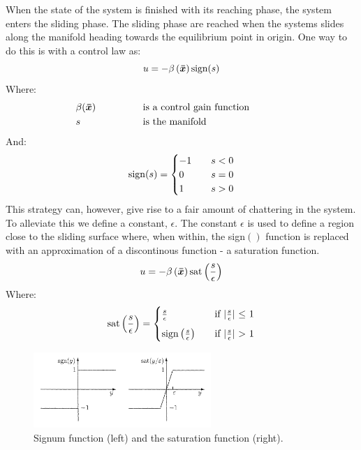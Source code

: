 When the state of the system is finished with its reaching phase, the system enters the sliding phase. The sliding phase
are reached when the systems slides along the manifold heading towards the equilibrium point in origin. One way to do
this is with a control law as:
\begin{equation}
  u = -\beta \left( \bm{\bar{x}} \right)\mathrm{sign}(s)
\end{equation}
Where:
\begin{alignat}{5}
       & \beta (\bm{\bar{x}}) & \hspace{1cm} & \quad\text{is a control gain function} \hspace{1cm} &  & \nonumber \\ 
       & s                & \hspace{1cm} & \quad\text{is the manifold} \hspace{1cm}            &  & \nonumber
\end{alignat}
And:
\begin{equation}
  \mathrm{sign}(s) =
  \begin{cases}
    -1 & \quad s < 0 \\
     0 & \quad s = 0 \\
     1 & \quad s > 0
  \end{cases}
\nonumber
\end{equation}
This strategy can, however, give rise to a fair amount of chattering in the system. To alleviate this we define a
constant, $\epsilon$. The constant $\epsilon$ is used to define a region close to the sliding surface where, when
within, the sign$()$ function is replaced with an approximation of a discontinous function - a saturation function.
\begin{equation}
  u = -\beta\left( \bm{\bar{x}} \right) \mathrm{sat}\left( \frac{s}{\epsilon} \right)
\end{equation}
Where:
\begin{equation}
  \mathrm{sat}\left( \frac{s}{\epsilon} \right) =
  \begin{cases}
    \frac{s}{\epsilon} &\quad \text{if $\vert\frac{s}{\epsilon}\vert$ $\leq$ 1} \\[2mm]
    \mathrm{sign}\left( \frac{s}{\epsilon} \right) &\quad \text{if $\vert \frac{s}{\epsilon}\vert$ $>$ 1}
  \end{cases}
\end{equation}

\begin{figure}[H]
  \centering
  \includegraphics[width=0.6\textwidth]{saturation}
  \caption{Signum function (left) and the saturation function (right).}
  \label{fig:sign_sat}
\end{figure}


